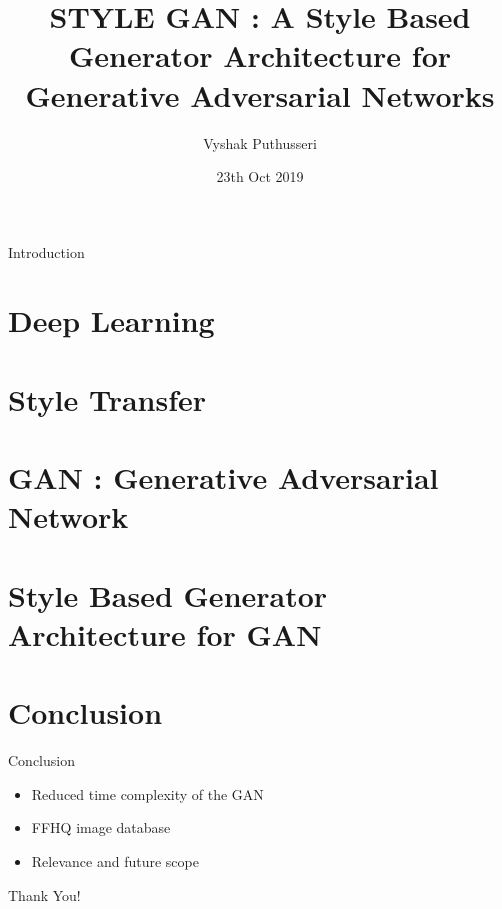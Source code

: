 \documentclass{beamer}
\author{Vyshak Puthusseri}
\date{23th Oct 2019}
\institute[CET]
{
College of Engineering, Trivandrum\\\\
\text{TVE17MCA054 }\\
}
\title{STYLE GAN : A Style Based Generator Architecture for Generative Adversarial Networks}
\begin{document}
\titlepage 
\begin{frame}
    {Introduction}
    \tableofcontents   
\end{frame}

\section{Deep Learning}
\section{Style Transfer}
\section{GAN : Generative Adversarial Network}
\section{Style Based Generator Architecture for GAN}







\section{Conclusion}
\begin{frame}{Conclusion}
    \begin{itemize}
        \item Reduced time complexity of the GAN 
        \item FFHQ image database
        \item Relevance and future scope
    
    \end{itemize}
\end{frame}
\begin{frame}%
\begin{center}
\Huge Thank You!
\end{center}
\end{frame}
\end{document}
